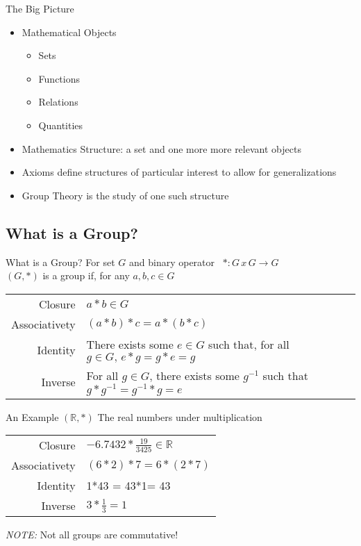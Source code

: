 \documentclass{beamer}
\begin{document}
				\begin{frame}{The Big Picture}
					\begin{itemize}
						\item Mathematical Objects
						\begin{itemize}
							\item Sets
							\item Functions
							\item Relations
							\item Quantities
						\end{itemize}
						\item Mathematics Structure: a set and one more more relevant objects
						\item Axioms define structures of particular interest to allow for generalizations
						\item Group Theory is the study of one such structure			
					\end{itemize}
				\end{frame}

			\subsection{What is a Group?}

				\begin{frame}{What is a Group?}
					 For set \(G\) and binary operator \, \(*:G \, x \, G \to G\) \\
					\((G,*)\) is a group if, for any \(a,b,c \in G\)	
					\begin{table}
						\centering
						\begin{tabular}{r|p{7cm}}
							Closure & \(a*b \in G\) \\[.3cm]
							Associativety & \((a*b)*c = a*(b*c)\) \\[.3cm]
							Identity & There exists some \(e \in G\) such that, for all \(g \in G, \, e*g = g*e = g\) \\[.3cm]
							Inverse & For all \(g \in G\), there exists some \(g^{-1}\) such that \(g*g^{-1} = g^{-1}*g = e\) \\
						\end{tabular}
					\end{table}
				\end{frame}
				
				\begin{frame}{An Example}
					\((\mathbb{R},*)\) \: The real numbers under multiplication
					\begin{table}
						\centering
						\begin{tabular}{r|p{7cm}}
							Closure & \(-6.7432*\frac{19}{3425} \in \mathbb{R}\) \\[.3cm]
							Associativety & \((6*2)*7 = 6*(2*7)\) \\[.3cm]
							Identity & 1*43 = 43*1= 43 \\[.3cm]
							Inverse & \(3*\frac{1}{3} = 1\) \\
						\end{tabular}
					\end{table}
					\emph{NOTE:} Not all groups are commutative!
				\end{frame}
		
\end{document}
